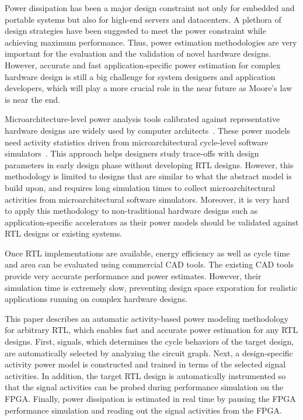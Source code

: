 Power dissipation has been a major design constraint not only for embedded and portable systems
but also for high-end servers and datacenters. A plethora of design strategies have been suggested
to meet the power constraint while achieving maximum performance. Thus, power estimation 
methodologies are very important for the evaluation and the validation of novel hardware designs.
However, accurate and fast application-specific power estimation for complex hardware design
is still a big challenge for system designers and application developers, which will play
a more crucial role in the near future as Moore's law is near the end.

Microarchitecture-level power analysis tools calibrated against representative hardware designs
are widely used by computer architects~\cite{Brooks2000, Vijaykrishnan2000, Li2009, Leng2013, Shao2014}.
These power models need activity statistics driven from microarchitectural cycle-level software
simulators~\cite{Binkert2011, Patel2011, Wenisch2006}. 
This approach helps designers study trace-offs with design parameters in early design phase
without developing RTL designs. However, this methodology is limited to designs that are similar 
to what the abstract model is build upon, and requires long simulation times to collect 
microarchitectural activities from microarchitectural software simulators. 
Moreover, it is very hard to apply this methodology to non-traditional hardware designs
such as application-specific accelerators as their power models should be validated against
RTL designs or existing systems.

Once RTL implementations are available, energy efficiency as well as cycle time and area
can be evaluated using commercial CAD tools. The existing CAD tools provide very accurate
performance and power estimates. However, their simulation time is extremely slow, preventing
design space exporation for realistic applications running on complex hardware designs.

This paper describes an automatic activity-based power modeling methodology for arbitrary RTL,
which enables fast and accurate power estimation for any RTL designs.
First, signals, which determines the cycle behaviors of the target design, are automatically
selected by analyzing the circuit graph. Next, a design-specific activity power model is constructed and
trained in terms of the selected signal activities. In addition, the target RTL design is automatically
instrumented so that the signal activities can be probed during performance simulation on the FPGA.
Finally, power dissipation is estimated in real time by pausing the FPGA performance simulation and
reading out the signal activities from the FPGA.